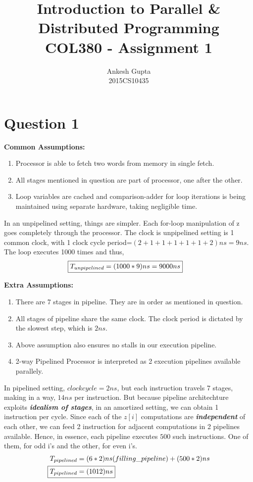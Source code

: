 \documentclass{article}
\newcommand{\bld}[1]{\textbf{#1}}
\newcommand{\ital}[1]{\textit{#1}}
\begin{document}
\title{Introduction to Parallel \&
Distributed Programming\\COL380 - Assignment 1}
\author{Ankesh Gupta\\2015CS10435}

\date{}
\maketitle

\section*{Question 1}

\bld{Common Assumptions:}
\begin{enumerate}
\item Processor is able to fetch two words from memory in single fetch.
\item All stages mentioned in question are part of processor, one after the other.
\item Loop variables are cached and comparison-adder for loop iterations is being maintained using separate hardware, taking negligible time.
\end{enumerate}  

In an unpipelined setting, things are simpler. Each for-loop manipulation of z goes completely through the processor. The clock is unpipelined setting is 1 common clock, with 1 clock cycle period=$(2+1+1+1+1+1+2)ns=9 ns$. The loop executes 1000 times and thus, 
\begin{align*}
\Aboxed{T_{unpipelined} &=(1000*9)ns=9000ns}
\end{align*}

\bld{Extra Assumptions:}
\begin{enumerate}
  \item There are 7 stages in pipeline. They are in order as mentioned in question.
  \item All stages of pipeline share the same clock. The clock period is dictated by the slowest step, which is $2ns$.
  \item Above assumption also ensures no stalls in our execution pipeline.
  \item 2-way Pipelined Processor is interpreted as 2 execution pipelines available parallely.
\end{enumerate}

In pipelined setting, $clock cycle=2ns$, but each instruction travels 7 stages, making in a way, $14ns$ per instruction. But because pipeline architechture exploits \bld{\ital{idealism of stages}}, in an amortized setting, we can obtain 1 instruction per cycle. Since each of the $z[i]$ computations are \bld{\ital{independent}} of each other, we can feed 2 instruction for adjacent computations in 2 pipelines available. Hence, in essence, each pipeline executes $500$ such instructions. One of them, for odd i's and the other, for even i's.
\begin{align*}
T_{pipelined} &=(6*2)ns(filling\_pipeline) + (500*2)ns\\
\Aboxed{T_{pipelined} &=(1012)ns}
\end{align*}
\end{document}
